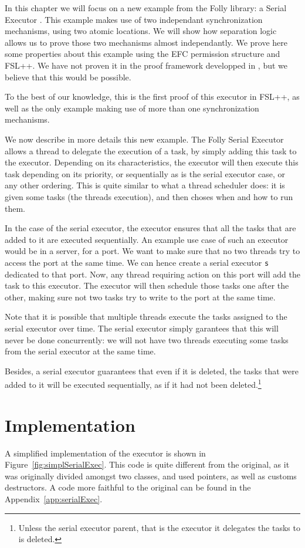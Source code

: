 \label{ch:serialExec}
In this chapter we will focus on a new example from the Folly library: a Serial Executor \cite{serialExec}. This example makes use of two independant synchronization mechanisms, using two atomic locations. We will show how separation logic allows us to prove those two mechanisms almost independantly. We prove here some properties about this example using the EFC permission structure and FSL++. We have not proven it in the proof framework developped in \cite{pascal}, but we believe that this would be possible.

To the best of our knowledge, this is the first proof of this executor in FSL++,  as well as the only example making use of more than one synchronization mechanisms.

We now describe in more details this new example. The Folly Serial Executor allows a thread to delegate the execution of a task, by simply adding this task to the executor. Depending on its characteristics, the executor will then execute this task depending on its priority, or sequentially as is the serial executor case, or any other ordering. This is quite similar to what a thread scheduler does: it is given some tasks (the threads execution), and then choses when and how to run them.

In the case of the serial executor, the executor ensures that all the tasks that are added to it are executed sequentially. An example use case of such an executor would be in a server, for a port. We want to make sure that no two threads try to access the port at the same time. We can hence create a serial executor \texttt{s} dedicated to that port. Now, any thread requiring action on this port will add the task to this executor. The executor will then schedule those tasks one after the other, making sure not two tasks try to write to the port at the same time.

Note that it is possible that multiple threads execute the tasks assigned to the serial executor over time. The serial executor simply garantees that this will never be done concurrently: we will not have two threads executing some tasks from the serial executor at the same time.

Besides, a serial executor guarantees that even if it is deleted, the tasks that were added to it will be executed sequentially, as if it had not been deleted.\footnote{Unless the serial executor parent, that is the executor it delegates the tasks to is deleted.}



\section{Implementation}
A simplified implementation of the executor is shown in Figure~\ref{fig:simplSerialExec}. This code is quite different from the original, as it was originally divided amongst two classes, and used pointers, as well as customs destructors. A code more faithful to the original can be found in the Appendix~\ref{app:serialExec}. 


